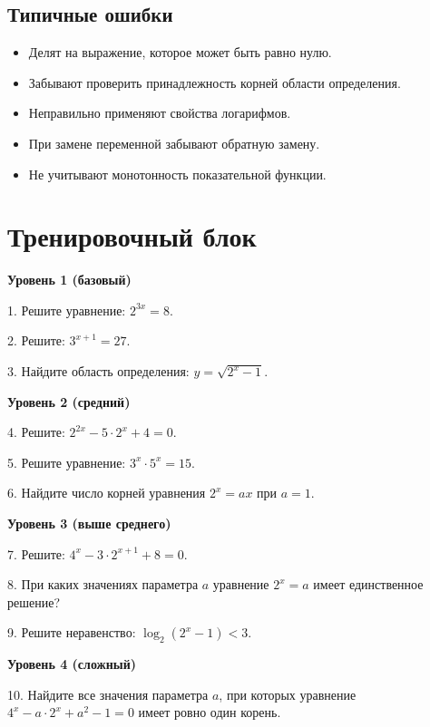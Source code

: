 \documentclass[a4paper,12pt]{article}
\begin{document}
\subsection*{Типичные ошибки}
\begin{itemize}[leftmargin=*]
\item[$\times$] Делят на выражение, которое может быть равно нулю.
\item[$\times$] Забывают проверить принадлежность корней области определения.
\item[$\times$] Неправильно применяют свойства логарифмов.
\item[$\times$] При замене переменной забывают обратную замену.
\item[$\times$] Не учитывают монотонность показательной функции.
\end{itemize}

\newpage
\section*{Тренировочный блок}

\textbf{Уровень 1 (базовый)}

1. Решите уравнение: $2^{3x} = 8$.

2. Решите: $3^{x+1} = 27$.

3. Найдите область определения: $y = \sqrt{2^x - 1}$.

\medskip
\textbf{Уровень 2 (средний)}

4. Решите: $2^{2x} - 5\cdot 2^x + 4 = 0$.

5. Решите уравнение: $3^{x} \cdot 5^{x} = 15$.

6. Найдите число корней уравнения $2^x = ax$ при $a = 1$.

\medskip
\textbf{Уровень 3 (выше среднего)}

7. Решите: $4^x - 3\cdot 2^{x+1} + 8 = 0$.

8. При каких значениях параметра $a$ уравнение $2^x = a$ имеет единственное решение?

9. Решите неравенство: $\log_2(2^x - 1) < 3$.

\medskip
\textbf{Уровень 4 (сложный)}

10. Найдите все значения параметра $a$, при которых уравнение $4^x - a\cdot 2^x + a^2 - 1 = 0$ имеет ровно один корень.
\end{document}
